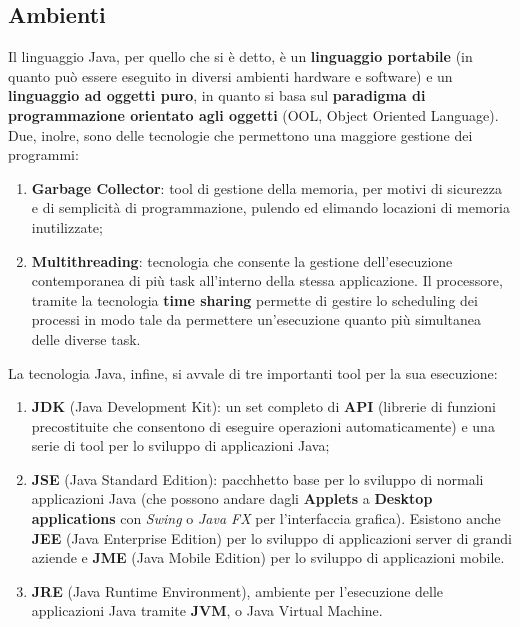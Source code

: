 \documentclass[a4paper]{extarticle}
\begin{document}
\subsection{Ambienti}
Il linguaggio Java, per quello che si è detto, è un \textbf{linguaggio portabile} (in quanto può essere eseguito in diversi ambienti hardware e software) e un \textbf{linguaggio ad oggetti puro}, in quanto si basa sul \textbf{paradigma di programmazione orientato agli oggetti} (OOL, Object Oriented Language). Due, inolre, sono delle tecnologie che permettono una maggiore gestione dei programmi:
\begin{enumerate}
  \item \textbf{Garbage Collector}: tool di gestione della memoria, per motivi di sicurezza e di semplicità di programmazione, pulendo ed elimando locazioni di memoria inutilizzate;
  \item \textbf{Multithreading}: tecnologia che consente la gestione dell'esecuzione contemporanea di più task all'interno della stessa applicazione. Il processore, tramite la tecnologia \textbf{time sharing} permette di gestire lo scheduling dei processi in modo tale da permettere un'esecuzione quanto più simultanea delle diverse task.
\end{enumerate}
La tecnologia Java, infine, si avvale di tre importanti tool per la sua esecuzione:
\begin{enumerate}
  \item \textbf{JDK} (Java Development Kit): un set completo di \textbf{API} (librerie di funzioni precostituite che consentono di eseguire operazioni automaticamente) e una serie di tool per lo sviluppo di applicazioni Java;
  \item \textbf{JSE} (Java Standard Edition): pacchhetto base per lo sviluppo di normali applicazioni Java (che possono andare dagli \textbf{Applets} a \textbf{Desktop applications} con \emph{Swing} o \emph{Java FX} per l'interfaccia grafica). Esistono anche \textbf{JEE} (Java Enterprise Edition) per lo sviluppo di applicazioni server di grandi aziende e \textbf{JME} (Java Mobile Edition) per lo sviluppo di applicazioni mobile.
  \item \textbf{JRE} (Java Runtime Environment), ambiente per l'esecuzione delle applicazioni Java tramite \textbf{JVM}, o Java Virtual Machine.
\end{enumerate}

\vspace{1em}
\end{document}
